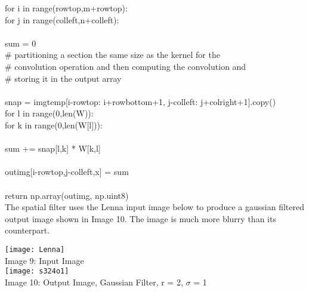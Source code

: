 \documentclass{article}
\begin{document}
	\indent \indent for i in range(row\textunderscore top,m+row\textunderscore top):\\
	\indent \indent \indent for j in range(col\textunderscore left,n+col\textunderscore left):\\
	\\
	\indent \indent \indent \indent sum = 0\\
	\indent \indent \indent \indent \# partitioning a section the same size as the kernel for the \\
	\indent \indent \indent \indent \# convolution operation and then computing the convolution and\\
	\indent \indent \indent \indent \# storing it in the output array\\
	\\
	\indent \indent \indent \indent snap = img\textunderscore temp[i-row\textunderscore top: i+row\textunderscore bottom+1, j-col\textunderscore left: j+col\textunderscore right+1].copy()\\
	\indent \indent \indent \indent for l in range(0,len(W)):\\
	\indent \indent \indent \indent \indent for k in range(0,len(W[l])):\\
	\\
	\indent \indent \indent \indent \indent \indent sum += snap[l,k] * W[k,l]\\
	\\
	\indent \indent \indent \indent out\textunderscore img[i-row\textunderscore top,j-col\textunderscore left,x] = sum\\
	\\
	\indent return np.array(out\textunderscore img, np.uint8)\\
	
	The spatial filter uses the Lenna input image below to produce a gaussian filtered output image shown in Image 10. The image is much more blurry than its counterpart.\\
	
	\begin{center}
		\noindent \texttt{[image: Lenna]}\\
		Image 9: Input Image\\
		
		\noindent \texttt{[image: s324o1]}\\
		Image 10: Output Image, Gaussian Filter, r = 2, $\sigma$ = 1\\
	\end{center}
	
\end{document}
